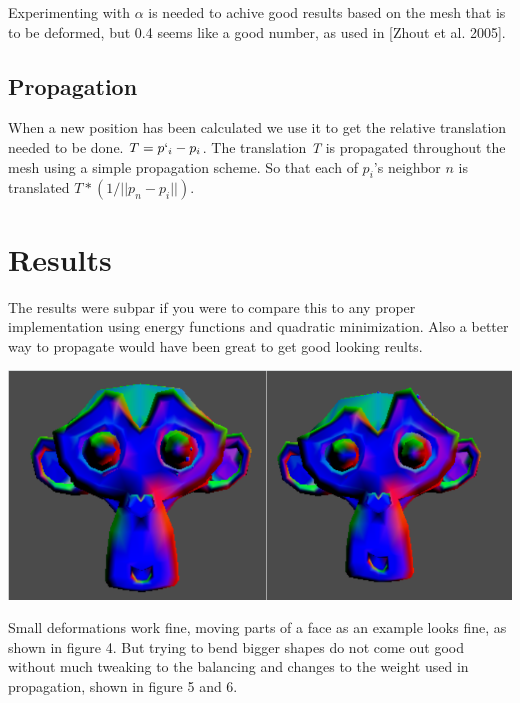 \documentclass[10pt]{article}
\newenvironment{Figure}
  {\par\medskip\noindent\minipage{\linewidth}}
  {\endminipage\par\medskip}
\begin{document}
\begin{multicols}{2}
Experimenting with $\alpha$ is needed to achive good results based on the mesh that is to be deformed, but 0.4 seems like a good number, as used in [Zhout et al. 2005].

\subsection{Propagation}
When a new position has been calculated we use it to get the relative translation needed to be done. $T = p`_i - p_i$. The translation \textit{T} is propagated throughout the mesh using a simple propagation scheme. So that each of $p_i$'s neighbor $n$ is translated $T*(1/||p_n - p_i||)$.

\section{Results}

The results were subpar if you were to compare this to any proper implementation using energy functions and quadratic minimization. Also a better way to propagate would have been great to get good looking reults. 

\begin{Figure}
	\centering
	\includegraphics[width=\linewidth]{mondef.png}
\end{Figure}

Small deformations work fine, moving parts of a face as an example looks fine, as shown in figure 4. But trying to bend bigger shapes do not come out good without much tweaking to the balancing and changes to the weight used in propagation, shown in figure 5 and 6.


\end{multicols}
\end{document}
